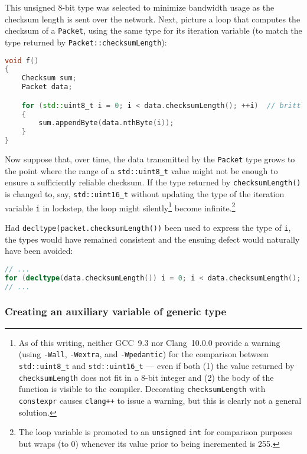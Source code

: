 \noindent This unsigned 8-bit type was selected to minimize bandwidth usage
as the checksum length is sent over the network. Next, picture a loop
that computes the checksum of a \lstinline!Packet!, using the same type for its iteration variable (to match the
type returned by \lstinline!Packet::checksumLength!):

\begin{lstlisting}[language=C++]
void f()
{
    Checksum sum;
    Packet data;

    for (std::uint8_t i = 0; i < data.checksumLength(); ++i)  // brittle
    {
        sum.appendByte(data.nthByte(i));
    }
}
\end{lstlisting}


Now suppose that, over time, the data transmitted by the \lstinline!Packet!
type grows to the point where the range of a \lstinline!std::uint8_t!
value might not be enough to ensure a sufficiently reliable checksum. If
the type returned by \lstinline!checksumLength()! is changed to, say,
\lstinline!std::uint16_t! without updating the type of the iteration
variable \lstinline!i! in lockstep, the loop might
silently{\cprotect\footnote{As of this writing, neither
GCC~9.3 nor Clang~10.0.0 provide
a warning (using \lstinline!-Wall!, \lstinline!-Wextra!, and
\lstinline!-Wpedantic!) for the comparison between \lstinline!std::uint8_t!
and \lstinline!std::uint16_t! --- even if both (1) the value returned by
\lstinline!checksumLength! does not fit in a 8-bit integer and (2) the
body of the function is visible to the compiler. Decorating
\lstinline!checksumLength! with \lstinline!constexpr! causes
\lstinline!clang++! to issue a warning, but this is clearly not a general
solution.}} become infinite.{\cprotect\footnote{The loop
variable is promoted to an \lstinline!unsigned! \lstinline!int! for
comparison purposes but wraps (to 0) whenever its value prior to
  being incremented is 255.}}

Had \lstinline!decltype(packet.checksumLength())! been used to express the
type of \lstinline!i!, the types would have remained consistent and the
ensuing defect would naturally have been avoided:

\begin{lstlisting}[language=C++]
// ...
for (decltype(data.checksumLength()) i = 0; i < data.checksumLength(); ++i)
// ...
\end{lstlisting}


\subsubsection[Creating an auxiliary variable of generic type]{Creating an auxiliary variable of generic type}\label{creating-an-auxiliary-variable-of-generic-type}

